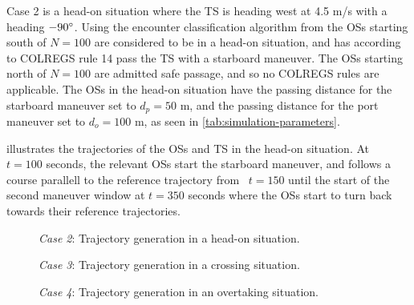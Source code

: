 Case 2 is a head-on situation where the TS is heading west at 4.5 m/s with a heading $-90\degree$. Using the encounter classification algorithm from \cite{Thyri2022-Confined-Waters} the OSs starting south of $N=100$ are considered to be in a head-on situation, and has according to COLREGS rule 14 pass the TS with a starboard maneuver. The OSs starting north of $N=100$ are admitted safe passage, and so no COLREGS rules are applicable. The OSs in the head-on situation have the passing distance for the starboard maneuver set to $d_p=50$ m, and the passing distance for the port maneuver set to $d_o=100$ m, as seen in \cref{tab:simulation-parameters}.  

 illustrates the trajectories of the OSs and TS in the head-on situation. At ~$t=100$ seconds, the relevant OSs start the starboard maneuver, and follows a course parallell to the reference trajectory from ~$t=150$ until the start of the second maneuver window at $t=350$ seconds where the OSs start to turn back towards their reference trajectories. 

\begin{figure}[htbp]
    \centering
    
    \caption{\emph{Case 2}: Trajectory generation in a head-on situation.}
    \label{fig:head-on}
\end{figure}


\label{sec:case-3-crossing}
\begin{figure}[htbp]
    \centering
    
    \caption{\emph{Case 3}: Trajectory generation in a crossing situation.}
    \label{fig:crossing}
\end{figure}



\label{sec:case-4-overtaking}
\begin{figure}[htbp]
    \centering
    
    \caption{\emph{Case 4}: Trajectory generation in an overtaking situation.}
    \label{fig:overtaking}
\end{figure}